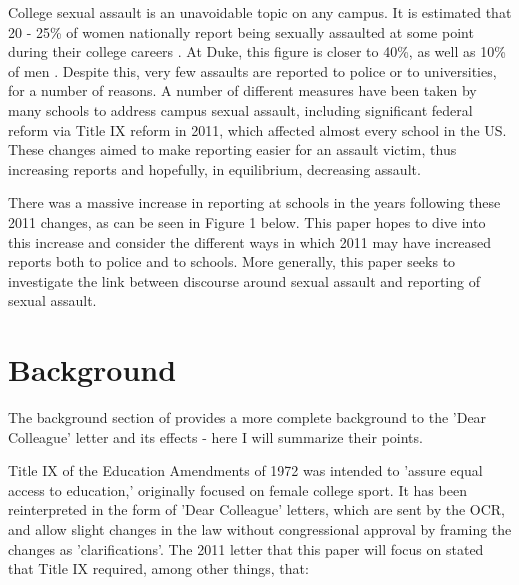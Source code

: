 \documentclass[AER]{AEA}
\begin{document}

\clearpage

College sexual assault is an unavoidable topic on any campus. It is estimated that 20 - 25\% of women nationally report being sexually assaulted at some point during their college careers \cite{fisher_sexual_2000}. At Duke, this figure is closer to 40\%, as well as 10\% of men \cite{fox_university_2017} . Despite this, very few assaults are reported to police or to universities, for a number of reasons. A number of different measures have been taken by many schools to address campus sexual assault, including significant federal reform via Title IX reform in 2011, which affected almost every school in the US. These changes aimed to make reporting easier for an assault victim, thus increasing reports and hopefully, in equilibrium, decreasing assault.

There was a massive increase in reporting at schools in the years following these 2011 changes, as can be seen in Figure 1 below. This paper hopes to dive into this increase and consider the different ways in which 2011 may have increased reports both to police and to schools. More generally, this paper seeks to investigate the link between discourse around sexual assault and reporting of sexual assault. 

\section{Background}

The background section of \cite{lindo_any_2018} provides a more complete background to the 'Dear Colleague' letter and its effects - here I will summarize their points. 

Title IX of the Education Amendments of 1972 was intended to 'assure equal access to education,' originally focused on female college sport. It has been reinterpreted in the form of 'Dear Colleague' letters, which are sent by the OCR, and allow slight changes in the law without congressional approval by framing the changes as 'clarifications'. The 2011 letter that this paper will focus on stated that Title IX required, among other things, that:
\end{document}
